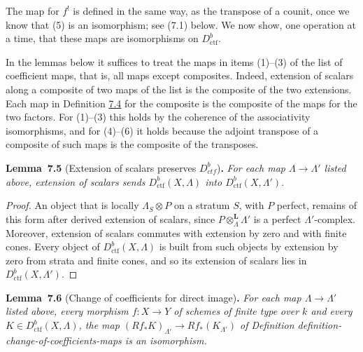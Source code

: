 \documentclass[11pt]{article}
\newenvironment{bpstatement}[2]{\par\addvspace{0.6\baselineskip}\noindent\textbf{#1}#2\textbf{.}\enspace\ignorespaces}
  {\par\addvspace{0.4\baselineskip}}
\newenvironment{bpstatementit}[2]{\begin{bpstatement}{#1}{#2}\itshape\ignorespaces}{\end{bpstatement}}
\providecommand{\Dctf}{}\renewcommand{\Dctf}{D^b_{ctf}}
\begin{document}
\label{bp13}%
The map for \(f^!\) is defined in the same way, as the transpose of a counit, once we know that (5) is an isomorphism; see (7.1) below. We now show, one operation at a time, that these maps are isomorphisms on \(D^b_{\mathrm{ctf}}\).

In the lemmas below it suffices to treat the maps in items (1)–(3) of the list of coefficient maps, that is, all maps except composites. Indeed, extension of scalars along a composite of two maps of the list is the composite of the two extensions. Each map in Definition \hyperref[bp12]{7.4} for the composite is the composite of the maps for the two factors. For (1)–(3) this holds by the coherence of the associativity isomorphisms, and for (4)–(6) it holds because the adjoint transpose of a composite of such maps is the composite of the transposes.

\label{bp14}%
\begin{bpstatementit}{Lemma~7.5}{ (Extension of scalars preserves $\Dctf$)}
For each map \(\Lambda\to\Lambda'\) listed above, extension of scalars sends \(D^b_{\mathrm{ctf}}(X,\Lambda)\) into \(D^b_{\mathrm{ctf}}(X,\Lambda')\).
\end{bpstatementit}

\begin{proof}[{Proof}]\label{bp15}%
An object that is locally \(\Lambda_S\otimes P\) on a stratum \(S\), with \(P\) perfect, remains of this form after derived extension of scalars, since \(P\otimes^{\mathbf L}_\Lambda\Lambda'\) is a perfect \(\Lambda'\)-complex. Moreover, extension of scalars commutes with extension by zero and with finite cones. Every object of \(D^b_{\mathrm{ctf}}(X,\Lambda)\) is built from such objects by extension by zero from strata and finite cones, and so its extension of scalars lies in \(D^b_{\mathrm{ctf}}(X,\Lambda')\).
\end{proof}

\label{bp16}%
\begin{bpstatementit}{Lemma~7.6}{ (Change of coefficients for direct image)}
For each map \(\Lambda\to\Lambda'\) listed above, every morphism \(f:X\to Y\) of schemes of finite type over \(k\) and every \(K\in D^b_{\mathrm{ctf}}(X,\Lambda)\), the map \((Rf_*K)_{\Lambda'}\to Rf_*(K_{\Lambda'})\) of Definition definition-change-of-coefficients-maps is an isomorphism.
\end{bpstatementit}
\end{document}
